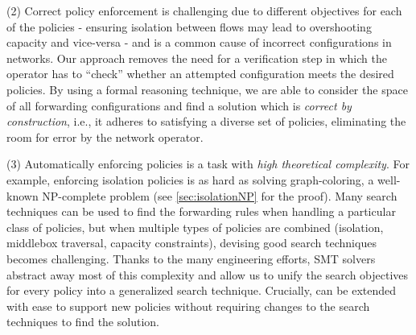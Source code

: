 
(2) Correct policy enforcement is challenging due to different
objectives for each of the policies - ensuring isolation between flows
may lead to overshooting capacity and vice-versa - and is a common
cause of incorrect configurations in networks.  Our approach removes
the need for a verification step in which the operator has to
``check'' whether an attempted configuration meets the desired
policies.  By using a formal reasoning technique, we are able to
consider the space of all forwarding configurations and find a
solution which is \emph{correct by construction}, i.e., it adheres to
satisfying a diverse set of policies, eliminating the room for error
by the network operator.

(3) Automatically enforcing policies is a task with
\emph{high theoretical complexity}. 
For example, enforcing isolation policies
is as hard as solving
graph-coloring, a well-known
NP-complete problem (see \cref{sec:isolationNP} for the proof).
Many search techniques can be used to find the forwarding rules when
handling a particular class of policies, but when multiple types of
policies are combined (isolation, middlebox traversal, capacity
constraints), devising good search techniques becomes challenging.
Thanks to the many engineering efforts, SMT solvers abstract away most
of this complexity and allow us to unify the search objectives for
every policy into a generalized search technique.
Crucially, \Name can be extended with ease to
support new policies without requiring changes to the search
techniques to find the solution.

